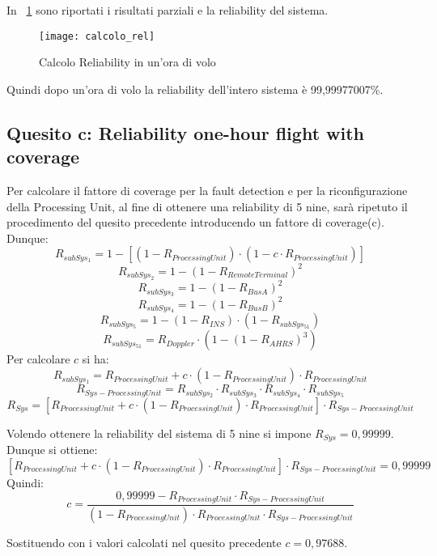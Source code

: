 \clearpage

In \figurename~\ref{calcolo_rel} sono riportati i risultati parziali e la
reliability del sistema.\\

\begin{figure}[!htbp]
  \centering
  \texttt{[image: calcolo\_rel]}
  \caption{Calcolo Reliability in un'ora di volo}
  \label{calcolo_rel}
\end{figure}

Quindi dopo un'ora di volo la reliability dell'intero sistema è 99,99977007\%.\\

\clearpage

\subsection{Quesito c: Reliability one-hour flight with coverage}

Per calcolare il fattore di coverage per la fault detection e per la riconfigurazione
della Processing Unit, al fine di ottenere una reliability di 5 nine, sarà ripetuto
il procedimento del quesito precedente introducendo un fattore di coverage(c).\\
Dunque:
$$R_{subSys_1} = 1 -[ (1 - R_{ProcessingUnit}) \cdot (1-c\cdot R_{ProcessingUnit})]$$
$$R_{subSys_2} = 1 - (1 - R_{RemoteTerminal})^2$$
$$R_{subSys_3} = 1 - (1 - R_{BusA})^2$$
$$R_{subSys_4} = 1 - (1 - R_{BusB})^2$$
$$R_{subSys_5} = 1 - (1 - R_{INS}) \cdot (1 - R_{subSys_{51}})$$
$$R_{subSys_{51}} = R_{Doppler} \cdot (1 - (1 - R_{AHRS})^3)$$
Per calcolare $c$ si ha:
$$R_{subSys_1} = R_{ProcessingUnit}+c\cdot(1-R_{ProcessingUnit} )\cdot R_{ProcessingUnit}$$
$$R_{Sys-ProcessingUnit} =  R_{subSys_2} \cdot R_{subSys_3} \cdot R_{subSys_4} \cdot R_{subSys_5}$$
$$R_{Sys}=[R_{ProcessingUnit}+c\cdot(1-R_{ProcessingUnit})\cdot R_{ProcessingUnit}]\cdot R_{Sys-ProcessingUnit}$$

\vspace{0.4cm}
Volendo ottenere la reliability del sistema di 5 nine si impone $R_{Sys}=0,99999$.\\
Dunque si ottiene:
$$[R_{ProcessingUnit}+c\cdot(1-R_{ProcessingUnit})\cdot R_{ProcessingUnit}]\cdot R_{Sys-ProcessingUnit}=0,99999$$
Quindi:
$$ c = \frac{0,99999-R_{ProcessingUnit}\cdot R_{Sys-ProcessingUnit}}{(1-R_{ProcessingUnit})\cdot R_{ProcessingUnit} \cdot R_{Sys-ProcessingUnit}}$$

\vspace{0.4cm}
Sostituendo con i valori calcolati nel quesito precedente $c=0,97688$.\\

